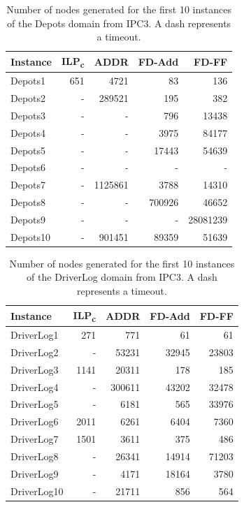 \begin{table}[p]
    \centering
    \begin{tabular}{lrrrr}
        \hline
        \textbf{Instance} & \textbf{ILP\textsubscript{c}} & \textbf{ADDR} & \textbf{FD-Add} & \textbf{FD-FF} \\ 
        \hline
        Depots1 & 651 & 4721 & 83 & 136 \\
        Depots2 & - & 289521 & 195 & 382 \\
        Depots3 & - & - & 796 & 13438 \\
        Depots4 & - & - & 3975 & 84177 \\
        Depots5 & - & - & 17443 & 54639 \\
        Depots6 & - & - & - & - \\ 
        Depots7 & - & 1125861 & 3788 & 14310 \\ 
        Depots8 & - & - & 700926 & 46652 \\
        Depots9 & - & - & - & 28081239 \\ 
        Depots10 & - & 901451 & 89359 & 51639 \\
        \hline
    \end{tabular}
    \caption{Number of nodes generated for the first 10 instances of the Depots domain from IPC3. A dash represents a timeout.}
    \label{fig:depotsNodes}
\end{table}


\begin{table}[p]
    \centering
    \begin{tabular}{lrrrr}
        \hline
        \textbf{Instance} & \textbf{ILP\textsubscript{c}} & \textbf{ADDR} & \textbf{FD-Add} & \textbf{FD-FF} \\ 
        \hline
        DriverLog1 & 271 & 771 & 61 & 61 \\
        DriverLog2 & - & 53231 & 32945 & 23803 \\ 
        DriverLog3 & 1141 & 20311 & 178 & 185 \\ 
        DriverLog4 & - & 300611 & 43202 & 32478 \\ 
        DriverLog5 & - & 6181 & 565 & 33976 \\
        DriverLog6 & 2011 & 6261 & 6404 & 7360 \\ 
        DriverLog7 & 1501 & 3611 & 375 & 486 \\
        DriverLog8 & - & 26341 & 14914 & 71203 \\ 
        DriverLog9 & - & 4171 & 18164 & 3780 \\
        DriverLog10 & - & 21711 & 856 & 564 \\
        \hline
    \end{tabular}
    \caption{Number of nodes generated for the first 10 instances of the DriverLog domain from IPC3. A dash represents a timeout.}
    \label{fig:driverLogNodes}
\end{table}


